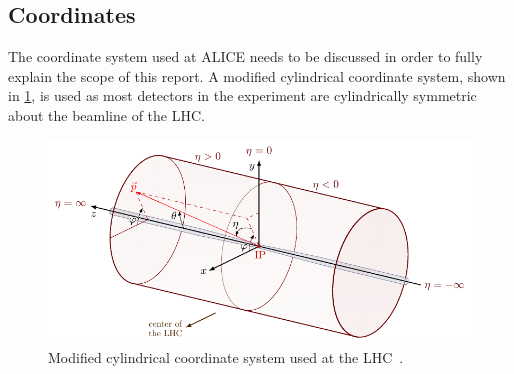 \subsection{Coordinates}
The coordinate system used at ALICE needs to be discussed in order to fully explain the scope of this report. A modified cylindrical coordinate system, shown in \cref{fig:coords}, is used as most detectors in the experiment are cylindrically symmetric about the beamline of the LHC. 

\begin{figure}[h]
    \begin{center}
        \includegraphics[width=.8\textwidth]{Figs/coords.pdf}
        \caption{Modified cylindrical coordinate system used at the LHC~\cite{coords}.}
        \label{fig:coords}
    \end{center}
\end{figure}

